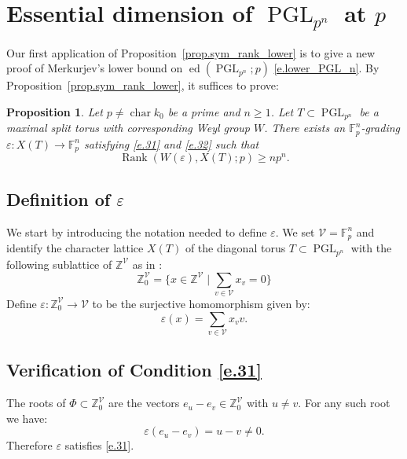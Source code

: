 \documentclass[12pt]{amsart}
\numberwithin{equation}{section}
\newtheorem{proposition}[theorem]{Proposition}
\theoremstyle{definition}
\newcommand{\cV}{\mathcal{V}}
\newcommand{\bF}{\mathbb{F}}
\newcommand{\bZ}{\mathbb{Z}}
\newcommand{\PGL}{\operatorname{PGL}}
\newcommand{\ed}{\operatorname{ed}}
\newcommand{\SymRank}{\operatorname{Rank}}
\newcommand{\Char}{\operatorname{char}}
\newcommand{\eps}{\varepsilon}
\begin{document}
\section{Essential dimension of \texorpdfstring{$\PGL_{p^n}$}{PGL} at \texorpdfstring{$p$}{p}}\label{subsect.PGL_n}
Our first application of Proposition~\ref{prop.sym_rank_lower} is to give a new proof of Merkurjev's lower bound on $\ed(\PGL_{p^n};p)$ \eqref{e.lower_PGL_n}. By Proposition~\ref{prop.sym_rank_lower}, it suffices to prove:
\begin{proposition}\label{prop.rank_PGLn}
Let $p \neq \Char k_0$ be a prime and $n\geq 1$.
Let $T\subset \PGL_{p^n}$ be a maximal split torus with corresponding Weyl group $W$. There exists an $\bF_p^n$-grading $\eps:X(T) \to \bF_p^n$ satisfying \eqref{e.31} and \eqref{e.32} such that
    \begin{equation}\label{e.symrankPGL_n}
    \SymRank(W(\eps),X(T);p) \geq n p^n.
\end{equation}
\end{proposition}

\subsection*{Definition of \texorpdfstring{$\eps$}{epsilon}}
We start by introducing the notation needed to define $\eps$. We set $\cV = \bF_p^n$ and identify the character lattice $X(T)$  of the diagonal torus $T\subset \PGL_{p^n}$ with the following sublattice of $\bZ^\cV$ as in \cite[Section 6]{conway2013sphere}:
    $$\bZ^\cV_0  = \{ x \in \bZ^\cV\mid \sum_{v\in \cV} x_v = 0\}$$
Define $\eps: \bZ^\cV_0 \to \cV$ to be the surjective homomorphism given by:
    $$\eps(x) = \sum_{v\in \cV} x_v v.$$
\subsection*{Verification of Condition \eqref{e.31}} 
     The roots of $\Phi\subset \bZ^\cV_0$ are the vectors $e_u - e_v\in \bZ^\cV_0$ with $u\neq v$.  For any such root we have:
    $$\eps(e_u - e_v) = u-v \neq 0.$$
    Therefore $\eps$ satisfies \eqref{e.31}.
\end{document}
